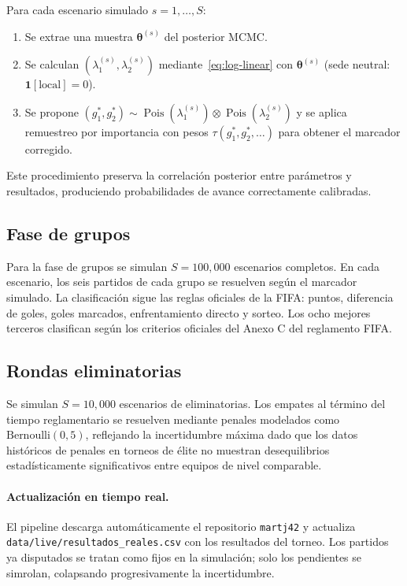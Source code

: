 \documentclass[12pt,a4paper]{article}
\begin{document}
Para cada escenario simulado $s = 1, \ldots, S$:
\begin{enumerate}
  \item Se extrae una muestra $\boldsymbol{\theta}^{(s)}$ del posterior MCMC.
  \item Se calculan $(\lambda_1^{(s)}, \lambda_2^{(s)})$ mediante~\eqref{eq:log-linear}
        con $\boldsymbol{\theta}^{(s)}$ (sede neutral: $\mathbf{1}[\text{local}] = 0$).
  \item Se propone $(g_1^*, g_2^*) \sim \operatorname{Pois}(\lambda_1^{(s)}) \otimes
        \operatorname{Pois}(\lambda_2^{(s)})$ y se aplica remuestreo por importancia
        con pesos $\tau(g_1^*, g_2^*, \ldots)$ para obtener el marcador corregido.
\end{enumerate}
Este procedimiento preserva la correlación posterior entre parámetros y resultados,
produciendo probabilidades de avance correctamente calibradas.

\subsection{Fase de grupos}

Para la fase de grupos se simulan $S = 100{,}000$ escenarios completos.
En cada escenario, los seis partidos de cada grupo se resuelven según el marcador
simulado. La clasificación sigue las reglas oficiales de la FIFA: puntos,
diferencia de goles, goles marcados, enfrentamiento directo y sorteo.
Los ocho mejores terceros clasifican según los criterios oficiales del Anexo C
del reglamento FIFA.

\subsection{Rondas eliminatorias}

Se simulan $S = 10{,}000$ escenarios de eliminatorias.
Los empates al término del tiempo reglamentario se resuelven mediante
penales modelados como $\text{Bernoulli}(0{,}5)$, reflejando la incertidumbre
máxima dado que los datos históricos de penales en torneos de élite no muestran
desequilibrios estadísticamente significativos entre equipos de nivel comparable.

\paragraph{Actualización en tiempo real.}
El pipeline descarga automáticamente el repositorio \texttt{martj42} y
actualiza \texttt{data/live/resultados\_reales.csv} con los resultados del
torneo. Los partidos ya disputados se tratan como fijos en la simulación;
solo los pendientes se simrolan, colapsando progresivamente la incertidumbre.
\end{document}
